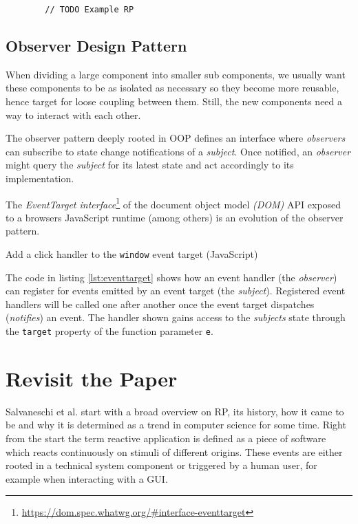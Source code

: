\documentclass[12pt,a4paper]{article}
\begin{document}
\begin{listing}[H]
	\begin{verbatim}
		// TODO Example RP
	\end{verbatim}
	\caption{}
	\label{lst:basic-rp-with-rxjs}
\end{listing}

\subsection{Observer Design Pattern}
When dividing a large component into smaller sub components, we usually want these components to be as isolated as necessary so they become more reusable, hence target for loose coupling between them. Still, the new components need a way to interact with each other.

The observer pattern \cite{gamma1995design} deeply rooted in OOP defines an interface where \emph{observers} can subscribe to state change notifications of a \emph{subject}. Once notified, an \emph{observer} might query the \emph{subject} for its latest state and act accordingly to its implementation.

The \emph{EventTarget interface}\footnote{\url{https://dom.spec.whatwg.org/\#interface-eventtarget}} of the document object model \emph{(DOM)} API exposed to a browsers JavaScript runtime (among others) is an evolution of the observer pattern.

\begin{listing}[H]
	\caption{Add a click handler to the \texttt{window} event target (JavaScript)}
	\label{lst:eventtarget}
\end{listing}

The code in listing \ref{lst:eventtarget} shows how an event handler (the \emph{observer}) can register for events emitted by an event target (the \emph{subject}). Registered event handlers will be called one after another once the event target dispatches (\emph{notifies}) an event. The handler shown gains access to the \emph{subjects} state through the \texttt{target} property of the function parameter \texttt{e}.


\section{Revisit the Paper}

Salvaneschi et al. start with a broad overview on RP, its history, how it came to be and why it is determined as a trend in computer science for some time. Right from the start the term reactive application is defined as a piece of software which reacts continuously on stimuli of different origins. These events are either rooted in a technical system component or triggered by a human user, for example when interacting with a GUI.
\end{document}
